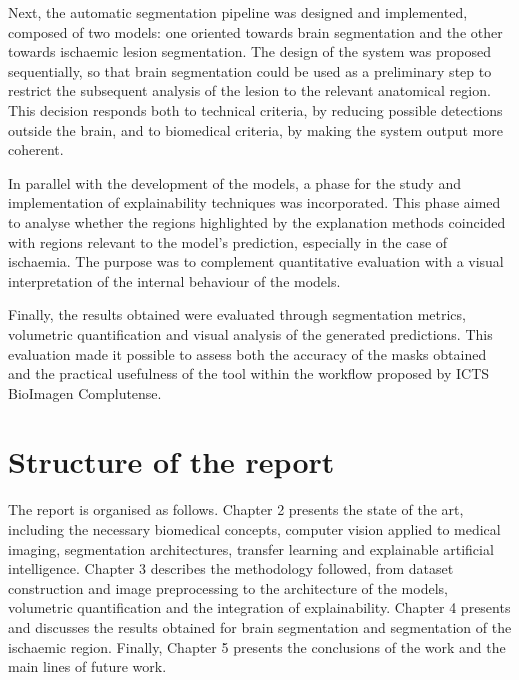 Next, the automatic segmentation pipeline was designed and implemented, composed of two models: one oriented towards brain segmentation and the other towards ischaemic lesion segmentation. The design of the system was proposed sequentially, so that brain segmentation could be used as a preliminary step to restrict the subsequent analysis of the lesion to the relevant anatomical region. This decision responds both to technical criteria, by reducing possible detections outside the brain, and to biomedical criteria, by making the system output more coherent.

In parallel with the development of the models, a phase for the study and implementation of explainability techniques was incorporated. This phase aimed to analyse whether the regions highlighted by the explanation methods coincided with regions relevant to the model's prediction, especially in the case of ischaemia. The purpose was to complement quantitative evaluation with a visual interpretation of the internal behaviour of the models.

Finally, the results obtained were evaluated through segmentation metrics, volumetric quantification and visual analysis of the generated predictions. This evaluation made it possible to assess both the accuracy of the masks obtained and the practical usefulness of the tool within the workflow proposed by ICTS BioImagen Complutense.

\section*{Structure of the report}

The report is organised as follows. Chapter 2 presents the state of the art, including the necessary biomedical concepts, computer vision applied to medical imaging, segmentation architectures, transfer learning and explainable artificial intelligence. Chapter 3 describes the methodology followed, from dataset construction and image preprocessing to the architecture of the models, volumetric quantification and the integration of explainability. Chapter 4 presents and discusses the results obtained for brain segmentation and segmentation of the ischaemic region. Finally, Chapter 5 presents the conclusions of the work and the main lines of future work.






